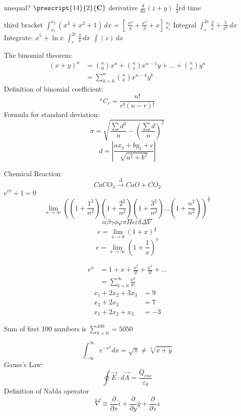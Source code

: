 unequal?
$ \prescript{14}{2}{\mathbf{C}} $
derivative
$\frac{d}{dx} (z+y)$
\cdot {}\)
 \(\frac{2}{3}\)rd time

third bracket
$\int_{x_1}^{x_2} (x^3 +x^2 +1) \,dx$ = $\left[\ \frac{x^4}{4} + \frac{x^3}{3} +x\right]\ _{x_1}^{x_2}$
Integral
\(\int_{e}^{2e} \frac{2}{x} + \frac{5}{x^3} \,dx\)
Integrate: \(x^5 +\ln x\)
$\int_{e}^{2e} \frac{2}{x} \,dx$
$\int (z) \,dx$

The binomial theorem:
\begin{align}
    (x+y)^n&=\binom{n}{0}x^n+\binom{n}{1}x^{n-1}y+\dots+\binom{n}{n}y^n\\
    &=\sum_{k=0}^n\binom{n}{k}x^{n-k}y^k
\end{align}
Definition of binomial coefficient:
$$^nC_r=\frac{n!}{r!(n-r)!}$$
Formula for standard deviation:
$$ \sigma=\sqrt{\frac{\sum d^2}{n}-\left(\frac{\sum d}{n}\right)^2} $$
$$ d=\left|\frac{ax_1+by_1+c}{\sqrt{a^2+b^2}}\right| $$

Chemical Reaction:
$$CaCO_3 \xrightarrow {\Delta} CaO+CO_2$$
$e^{i\pi }+1=0$
$$\lim_{n\to\infty}\left((1+\frac{1^2}{n^2})(1+\frac{2^2}{n^2})(1+\frac{3^2}{n^2})\dots(1+\frac{n^2}{n^2})\right)^\frac{1}{n}$$
$$ \alpha \beta \gamma \phi \varphi \pi \Pi \epsilon \varepsilon \delta \Delta \nabla $$
$$ e=\lim_{x\to0}(1+x)^{\frac{1}{x}}$$
$$ e=\lim_{x\to\infty}\left(1+\frac{1}{x}\right)^x$$

\begin{align*}
    e^x&=1+x+\frac{x^2}{2!}+\frac{x^3}{3!}+\dots \\
       &=\sum_{k=0}^{\infty} \frac{x^k}{k!}
\end{align*}
\begin{align*}
      x_1+2x_2+3x_3&=9 \\
      x_2+2x_3&=7 \\
      x_1+2x_2+x_3&=-3 
\end{align*}

Sum of first 100 numbers is $\sum_{k=0}^{100}=5050$

\begin{equation}
    \int_{-\infty}^{\infty}e^{-x^2}dx=\sqrt{\pi}\neq 
    \sqrt[3]{x+y}
\end{equation}
Gauss's Law:
\begin{equation}
    \oint \vec{E}\cdot d\Vec{A} = \frac{Q_{enc}}{\varepsilon_0}
\end{equation}
Definition of Nabla operator
\begin{equation*}
    \vec{\nabla} \equiv \frac{\partial}{\partial x}\hat{i}+\frac{\partial}{\partial y}\hat{y}+\frac{\partial}{\partial z}\hat{z}
\end{equation*}


